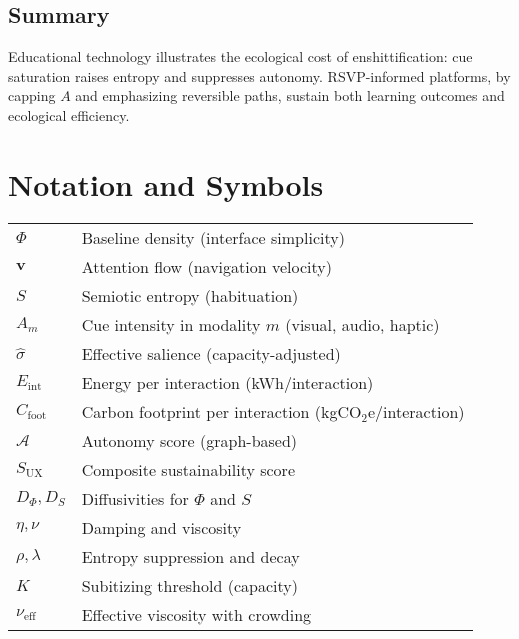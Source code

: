\documentclass[openany]{book}
\newcommand{\Eint}{E_{\mathrm{int}}} %
\newcommand{\Cfoot}{C_{\mathrm{foot}}} %
\newcommand{\Auton}{\mathcal{A}} %
\newcommand{\SUX}{S_{\mathrm{UX}}} %
\begin{document}
\section{Summary}
\label{sec:edu-summary}
Educational technology illustrates the ecological cost of enshittification: cue saturation raises entropy and suppresses autonomy.  
RSVP-informed platforms, by capping $A$ and emphasizing reversible paths, sustain both learning outcomes and ecological efficiency.

\chapter{Notation and Symbols}
\label{app:notation}

\begin{tabular}{ll}
$\Phi$ & Baseline density (interface simplicity) \\
$\mathbf{v}$ & Attention flow (navigation velocity) \\
$S$ & Semiotic entropy (habituation) \\
$A_m$ & Cue intensity in modality $m$ (visual, audio, haptic) \\
$\widehat{\sigma}$ & Effective salience (capacity-adjusted) \\
$\Eint$ & Energy per interaction (kWh/interaction) \\
$\Cfoot$ & Carbon footprint per interaction (kgCO$_2$e/interaction) \\
$\Auton$ & Autonomy score (graph-based) \\
$\SUX$ & Composite sustainability score \\
$D_\Phi,D_S$ & Diffusivities for $\Phi$ and $S$ \\
$\eta,\nu$ & Damping and viscosity \\
$\rho,\lambda$ & Entropy suppression and decay \\
$K$ & Subitizing threshold (capacity) \\
$\nu_{\mathrm{eff}}$ & Effective viscosity with crowding \\
\end{tabular}



\end{document}
